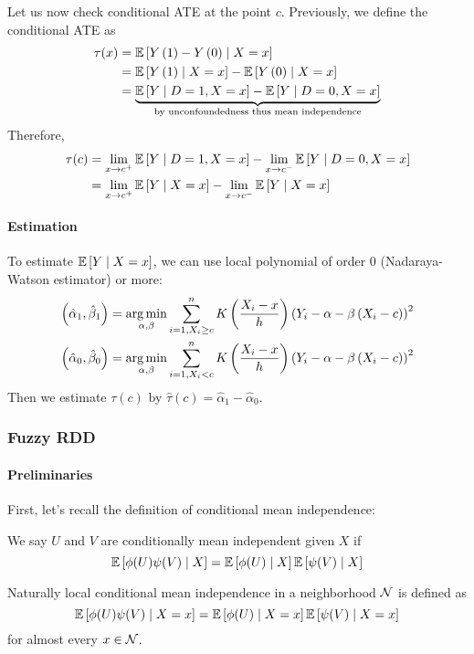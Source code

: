 Let us now check conditional ATE at the point $c$. Previously, we define the
conditional ATE as \begin{equation*}
    \begin{split}
        \tau(x) & = \mathbb{E}\left[Y\left(1\right)-Y\left(0\right)\mid X=x\right] \\&= \mathbb{E}\left[Y\left(1\right)\mid X=x\right]-\mathbb{E}\left[Y\left(0\right)\mid X=x\right] \\& =\underbrace{\mathbb{E}\left[Y\mid D=1,X=x\right]-\mathbb{E}\left[Y\mid D=0,X=x\right]}_{\text{by unconfoundedness thus mean independence}} \\
    \end{split}
\end{equation*}
Therefore, \begin{equation}
    \begin{split}
        \tau(c) & = \lim_{x\to c^+}\mathbb{E}\left[Y\mid D=1,X=x\right]-\lim_{x\to c^-}\mathbb{E}\left[Y\mid D=0,X=x\right] \\ &= \lim_{x\to c^+} \mathbb{E}\left[Y\mid X=x\right]-\lim_{x\to c^-}\mathbb{E}\left[Y\mid X=x\right]
    \end{split}
\end{equation}

\paragraph{Estimation}
To estimate $\mathbb{E}\left[Y\mid X=x\right]$, we can use local polynomial of order 0
(Nadaraya-Watson estimator) or more:
\begin{align*}
    \left(\hat{\alpha}_1,\hat{\beta}_1\right) = \operatorname*{arg\,min}_{\alpha,\beta}\sum_{i=1,X_i\ge c}^n K\left(\frac{X_i-x}{h}\right)\left(Y_i-\alpha-\beta\left(X_i-c\right)\right)^2 \\
    \left(\hat{\alpha}_0,\hat{\beta}_0\right) = \operatorname*{arg\,min}_{\alpha,\beta}\sum_{i=1,X_i< c}^n K\left(\frac{X_i-x}{h}\right)\left(Y_i-\alpha-\beta\left(X_i-c\right)\right)^2
\end{align*}
Then we estimate $\tau(c)$ by $\hat{\tau}(c) = \hat{\alpha}_1-\hat{\alpha}_0$.
\subsubsection{Fuzzy RDD}
\paragraph{Preliminaries}
First, let's recall the definition of conditional mean independence:
\begin{definition}
    We say $U$ and $V$ are conditionally mean independent given $X$ if \begin{equation*}
        \mathbb{E}\left[\phi(U)\psi(V)\mid X\right] = \mathbb{E}\left[\phi(U)\mid X\right]\mathbb{E}\left[\psi(V)\mid X\right]
    \end{equation*}
\end{definition} Naturally local conditional mean independence in a neighborhood $\mathcal{N}$ is defined as \begin{equation*}
    \mathbb{E}\left[\phi(U)\psi(V)\mid X=x\right] = \mathbb{E}\left[\phi(U)\mid X=x\right]\mathbb{E}\left[\psi(V)\mid X=x\right]
\end{equation*} for almost every $x\in \mathcal{N}$.
